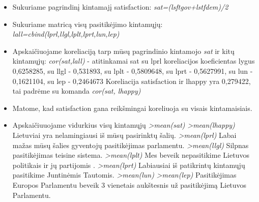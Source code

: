 \documentclass[a4paper]{article}
\begin{document}
\begin{enumerate}
\begin{itemize}
\item Sukuriame pagrindinį kintamajį satisfaction:
\newline 
\textit{sat=(lsftgov+lstfdem)/2}
\item Sukuriame matricą visų pasitikėjimo kintamųjų:
\newline \textit {lall=cbind(lprl,llgl,lplt,lprt,lun,lep)}
\item Apskaičiuojame koreliaciją tarp mūsų pagrindinio kintamojo \textit{sat} ir kitų kintamųjų:
\newline  \textit{cor(sat,lall)}  -  atitinkamai sat su lprl koreliacijos koeficientas lygus 0,6258285,  su  llgl -  0,531893, su lplt - 0,5809648, su lprt - 0,5627991, su lun - 0,1621104, su lep - 0,2464673
\newline Koreliacija satisfaction ir  lhappy yra 0,279422, tai padrėme su komanda 
\newline \textit{cor(sat, lhappy)}
\item Matome, kad satisfaction gana reikšmingai koreliuoja su visais kintamaisiais.

\item Apskaičiuuojame vidurkius visų kintamųjų
\newline \textit{ >mean(sat) 
   }
\newline \textit{ >mean(lhappy) 
   }
\newline Lietuviai yra nelamingiausi iš mūsų pasirinktų šalių.
\newline \textit{ >mean(lprl) 
   }
\newline Labai mažas mūsų šalies gyventojų pasitikėjimas parlamentu.
\newline \textit{ >mean(llgl) 
   }
\newline Silpnas pasitikėjimas teisine sistema.
\newline \textit{ >mean(lplt) 
   }
\newline Mes beveik nepasitikime Lietuvos politikais ir jų partijomis .
\newline \textit{ >mean(lprt)  
   }
\newline Labiausiai iš patikrintų kintamųjų pasitikime Juntinėmis Tautomis.
\newline \textit{ >mean(lun) 
   }
\newline \textit{ >mean(lep) 
   }
\newline Pasitikėjimas Europos Parlamentu beveik 3 vienetais aukštesnis už pasitikėjimą Lietuvos Parlamentu.


\end{itemize}
\end{enumerate}
\end{document}
